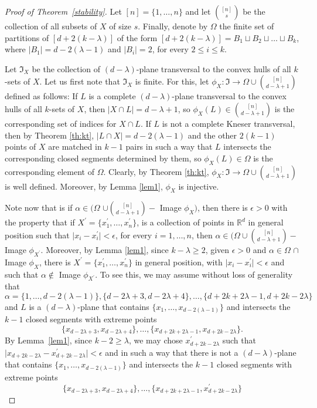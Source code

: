 \documentclass[11pt]{amsart}
\theoremstyle{plain}
\theoremstyle{definition}
\theoremstyle{remark}
\begin{document}
\begin{proof}[Proof of Theorem~\ref{stability}]
Let  $[n]=\{1, \dots,n\}$  and let $\binom{[n]}{s}$ be the collection of all subsets of $X$ of size $s$. Finally, denote by $\Omega$  the finite set of partitions of $[d + 2(k-\lambda)]$ of the form $[d + 2(k-\lambda)]=B_1\sqcup B_2\sqcup \dots \sqcup B_k$, where $\mid B_1 \mid = d-2(\lambda-1)$ and $\mid B_i \mid = 2$, for every $2{\leqslant} i {\leqslant} k$.
\medskip

Let $\Im_X$ be the collection of $(d-\lambda)$-plane transversal to the convex hulls of all $k$-sets of $X$. Let us first note that $\Im_X$ is finite. For this, let $\phi_X:\Im \to \Omega \cup \binom{[n]}{d-\lambda +1}$ defined as follows:
If $L$ is a complete $(d-\lambda)$-plane transversal to the convex hulls of all $k$-sets of $X$, then $\mid X\cap L\mid = d-\lambda +1$, so $\phi_X(L)\in \binom{[n]}{d-\lambda +1}$ is the corresponding set of indices for $X\cap L$. If $L$ is not a complete Kneser transversal, then by Theorem \ref{th:kt}, $\mid L\cap X \mid= d-2(\lambda-1)$ and the other $2(k-1)$ points of $X$ are matched in $k-1$ pairs in such a way that $L$ intersects the corresponding closed segments determined by them, so $\phi_X(L)\in \Omega$ is the corresponding  element of $\Omega$. Clearly, by Theorem \ref{th:kt}, $\phi_X:\Im \to \Omega \cup \binom{[n]}{d-\lambda +1}$ is well defined. Moreover, by Lemma \ref{lem1}, $\phi_X$ is injective.
\medskip

Note now that is if $\alpha \in (\Omega$  $\cup \binom{[n]}{d-\lambda +1}-$ Image $\phi_X)$, then there is $\epsilon >0$ with the property that if $X^\prime=\{x^\prime_1,\dots ,x^\prime_n\}$, is a collection of points in ${\mathbb{R}}^{d}$  in general position such that $\mid x_i - x^\prime _i \mid < \epsilon$, for every $i=1,\dots ,n$, then $\alpha \in (\Omega \cup \binom{[n]}{d-\lambda +1}-$ Image $\phi_{X^\prime}$. Moreover, by Lemma \ref{lem1}, since $k-\lambda {\geqslant} 2$, given $\epsilon >0$ and  $\alpha \in \Omega$  $ \cap $ Image $\phi_X$, there is $X^\prime=\{x^\prime_1,\dots ,x^\prime_n\}$ in general position, with $\mid x_i - x^\prime _i \mid < \epsilon$ and such that $\alpha \notin$ Image $\phi_{X^\prime}$. To see this, we may assume without loss of generality that
$$
\alpha= \{ 1, \dots ,d-2(\lambda-1)\}, \{d-2\lambda +3, d-2\lambda+4\}, \dots , \{d+2k+2\lambda-1, d+2k-2\lambda\}
$$
and $L$ is a $(d-\lambda)$-plane that contains $\{ x_1, \dots ,x_{d-2(\lambda-1)}\}$ and intersects the $k-1$ closed segments with extreme points
$$
\{x_{d-2\lambda +3}, x_{d-2\lambda+4}\}, \dots ,  \{x_{d+2k+2\lambda-1}, x_{d+2k-2\lambda}\}.
$$
By Lemma~\ref{lem1}, since $k-2{\geqslant} \lambda$, we may chose $x^{\prime}_{d+2k-2\lambda}$ such that $\mid x_{d+2k-2\lambda}-x^{\prime}_{d+2k-2\lambda}\mid<\epsilon $ and in such a way that there is not a $(d-\lambda)$-plane that contains $\{ x_1, \dots ,x_{d-2(\lambda-1)}\}$ and intersects the $k-1$ closed segments with extreme points
$$
\{x_{d-2\lambda +3}, x_{d-2\lambda+4}\}, \dots ,  \{x_{d+2k+2\lambda-1}, x^{\prime}_{d+2k-2\lambda}\}
$$


\end{proof}
\end{document}
